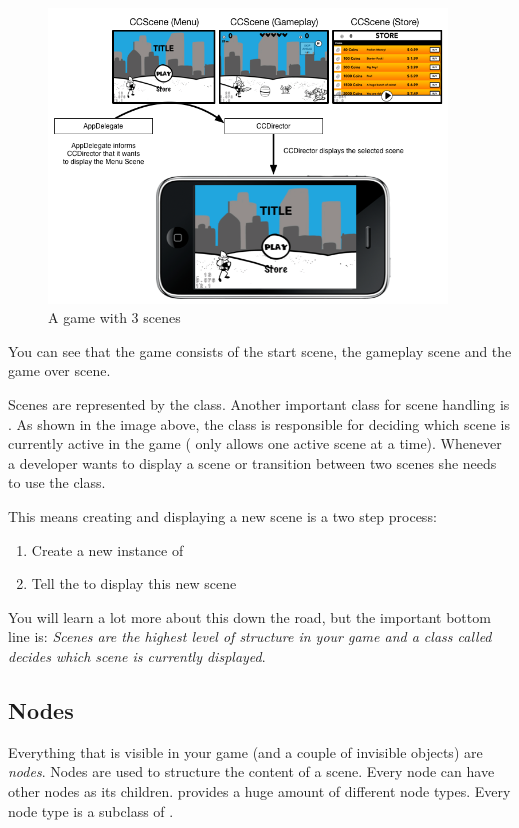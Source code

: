 \begin{figure}[H]
    \centering
    \includegraphics[width=300pt]{images/Chapter1/scenegraph.png}     
    \caption{A game with 3 scenes}
\end{figure}

You can see that the game consists of the start scene, the gameplay scene and
the game over scene.

Scenes are represented by the \ccscene{} class. Another
important \cocos{} class for scene handling is \ccdirector{}.
As shown in the image above, the \ccdirector{} class is responsible for deciding
which scene is currently active in the game (\cocos{} only allows one active scene at a time). 
Whenever a developer wants to display a scene or transition between two scenes
she needs to use the \ccdirector{} class.

This means creating and displaying a new scene is a two step process:
\begin{enumerate}
\item Create a new instance of \ccscene{}
\item Tell the \ccdirector{} to display this new scene
\end{enumerate}

You will learn a lot more about this down the road, but the important bottom
line is: \textit{Scenes are the highest level of structure in your game and a
class called \ccdirector{} decides which scene is currently displayed}.

\subsection{Nodes}
Everything that is visible in your \cocos{} game (and a couple of invisible
objects) are \textit{nodes}. Nodes are used to structure the content of a scene.
Every node can have other nodes as its children. \cocos{} provides a huge amount
of different node types. Every node type is a subclass of \ccnode{}.

